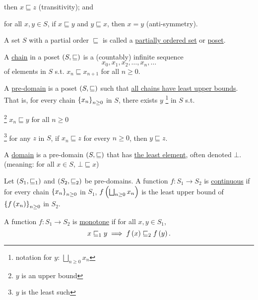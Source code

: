 \begin{enumcirc}
\begin{definition}
\begin{enumrm}
			then $x \sqsubseteq z$ (transitivity); and
			\item
			for all $x, y \in S$, if $x \sqsubseteq y$ and $y \sqsubseteq x$, then $x = y$
			(anti-symmetry).
		\end{enumrm}
		A set $S$ with a partial order $\sqsubseteq$ is called a
		\ul{partially ordered set} or \ul{poset}.
	\end{definition}
	\begin{definition}
		A \ul{chain} in a poset $\left( S, \sqsubseteq \right)$ is a (countably) infinite
		sequence
		\[
			x_0, x_1, x_2, \dots , x_n, \dots
		\]
		of elements in $S$ s.t. $x_n \sqsubseteq x_{n+1}$ for all $n \geq 0$.
	\end{definition}
	\begin{definition}
		A \ul{pre-domain} is a poset $\left( S, \sqsubseteq \right)$ such that \ul{all
			chains have least upper bounds}.
		That is, for every chain $\left\{ x_n \right\}_{n \geq 0}$ in $S$, there exists $y$
		\footnote{notation for $y$: $\displaystyle\bigsqcup_{n \geq 0} x_n$}
		in $S$ s.t.
		\begin{enumrm}
			\item
			\footnote{$y$ is an upper bound}
			$x_n \sqsubseteq y$ for all $n \geq 0$
			\item
			\footnote{$y$ is the least such}
			for any $z$ in $S$, if $x_n \sqsubseteq z$ for every $n \geq 0$, then $y
				\sqsubseteq z$.
		\end{enumrm}
	\end{definition}
	\begin{definition}
		A \ul{domain} is a pre-domain $\left( S, \sqsubseteq \right)$ that has
		\ul{the least element}, often denoted $\bot$.
		(meaning: for all $x \in S$, $\bot \sqsubseteq x$)
	\end{definition}
	\begin{definition}
		Let $\left( S_1, \sqsubseteq_1 \right)$ and $\left( S_2, \sqsubseteq_2 \right)$ be
		pre-domains.
		A function $f : S_1 \to S_2$ is \ul{continuous} if for every chain
		$\left\{ x_n \right\}_{n \geq 0}$ in $S_1$,
		$f \left( \bigsqcup_{n \geq 0} x_n \right)$ is the least upper bound of
		$\left\{ f \left( x_n \right) \right\}_{n \geq 0}$ in $S_2$.
	\end{definition}
	\begin{definition}
		A function $f : S_1 \to S_2$ is \ul{monotone} if for all $x, y \in S_1$,
		\[
			x \sqsubseteq_1 y \implies f \left( x \right) \sqsubseteq_2 f \left( y \right).
\]
\end{definition}
\end{enumcirc}

